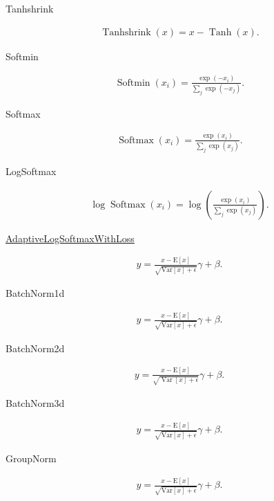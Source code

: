 Tanhshrink

\begin{align}
    \operatorname{Tanhshrink} (x)=x- \operatorname{Tanh} (x).
\end{align}

Softmin

\begin{align}
    \operatorname{Softmin}\left (x_{i}\right)=\frac{\exp \left (-x_{i}\right)}{\sum_{j} \exp \left (-x_{j}\right)}.
\end{align}

Softmax

\begin{align}
    \operatorname{Softmax}\left (x_{i}\right)=\frac{\exp \left (x_{i}\right)}{\sum_{j} \exp \left (x_{j}\right)}.
\end{align}

LogSoftmax

\begin{align}
    \log \operatorname{Softmax}\left (x_{i}\right)=\log \left (\frac{\exp \left (x_{i}\right)}{\sum_{j} \exp \left (x_{j}\right)}\right).
\end{align}


\href{https://pytorch.org/docs/stable/nn.html#torch.nn.Softshrink}{AdaptiveLogSoftmaxWithLoss}

\begin{align}
    y=\frac{x-\mathrm{E}[x]}{\sqrt{\mathrm{Var}[x]+\epsilon}}  \gamma+\beta.
\end{align}

BatchNorm1d

\begin{align}
    y=\frac{x-\mathrm{E}[x]}{\sqrt{\mathrm{Var}[x]+\epsilon}}  \gamma+\beta.
\end{align}

BatchNorm2d

\begin{align}
    y=\frac{x-\mathrm{E}[x]}{\sqrt{\operatorname{Var}[x]+\epsilon}}  \gamma+\beta.
\end{align}

BatchNorm3d

\begin{align}
    y=\frac{x-\mathrm{E}[x]}{\sqrt{\mathrm{Var}[x]+\epsilon}}  \gamma+\beta.
\end{align}

GroupNorm

\begin{align}
    y=\frac{x-\mathrm{E}[x]}{\sqrt{\mathrm{Var}[x]+\epsilon}}  \gamma+\beta.
\end{align}

